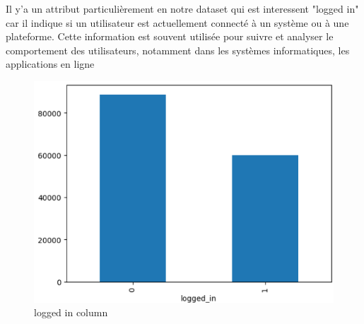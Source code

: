 \documentclass[a4paper,12pt]{report}
\begin{document}
\noindent\normalsize Il y'a un attribut particulièrement en notre dataset qui est interessent "logged in" car il indique si un utilisateur est actuellement connecté à un système ou à une plateforme. Cette information est souvent utilisée pour suivre et analyser le comportement des utilisateurs, notamment dans les systèmes informatiques, les applications en ligne
\begin{figure}[H]
\centering
 \includegraphics[scale=0.9]{outils-images/graphs/g4.png}
\caption{logged in column}
\end{figure}
\end{document}
